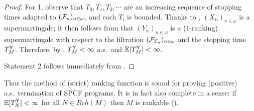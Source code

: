 \begin{proof}
For 1, observe that $T_0, T_1, T_2, \cdots$ are an increasing sequence of stopping times adapted to $(\mathcal{F}_n)_{n \in \omega}$, and each $T_i$ is bounded.
Thanks to , 
$(X_n)_{n \in \omega}$ is a supermartingale;
it then follows from  that $(Y_n)_{n \in \omega}$ is a ($1$-ranking) supermartingale with respect to the filtration $(\mathcal{F}_{T_n})_{n \in \omega}$ and the stopping time $T^{\mathsf{Y}}_M$.
Therefore, by , $T^{\mathsf{Y}}_M < \infty$ a.s.~and $\mathbb{E}[T^{\mathsf{Y}}_M] < \infty$.

Statement 2 follows immediately from .
\end{proof}

Thus the method of (strict) ranking function is sound for proving (positive) a.s.~termination of SPCF programs.
It is in fact also complete in a sense: if $\mathbb{E}[T^{\mathsf{Y}}_N] < \infty$ for all $N \in \mathit{Rch}(M)$ then $M$ is rankable ().
